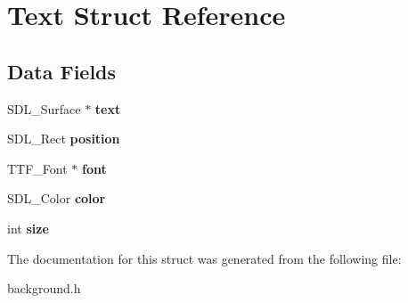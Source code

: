 \hypertarget{structText}{}\section{Text Struct Reference}
\label{structText}
\subsection*{Data Fields}
\begin{DoxyCompactItemize}
\item 
\mbox{\label{structText_aff9f844dbb049d64f616d143376b7d55}} 
S\+D\+L\+\_\+\+Surface $\ast$ {\bfseries text}
\item 
\mbox{\label{structText_a6bedd1f0e3a1422ae4533301a8fe0641}} 
S\+D\+L\+\_\+\+Rect {\bfseries position}
\item 
\mbox{\label{structText_ae23ac53acb57e760b91c81d8c4aec8c7}} 
T\+T\+F\+\_\+\+Font $\ast$ {\bfseries font}
\item 
\mbox{\label{structText_ab0f771bd18d8e968f7aaee4a4e26e385}} 
S\+D\+L\+\_\+\+Color {\bfseries color}
\item 
\mbox{\label{structText_aeeefa18b9d848a532e402065815d21b7}} 
int {\bfseries size}
\end{DoxyCompactItemize}


The documentation for this struct was generated from the following file\+:\begin{DoxyCompactItemize}
\item 
background.\+h\end{DoxyCompactItemize}
